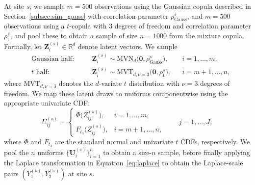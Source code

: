 \documentclass[12pt]{article}
\newcommand{\rhou}[1]{\rho_{\text{#1}}}
\newcommand{\RG}[1]{\Sigma_{\mathrm{Gauss}}^{#1}}   %
\newcommand{\RT}[1]{\Sigma_{t}^{#1}}                %
\begin{document}
At site $s$, we sample $m = 500$ observations using the Gaussian copula described in Section~\ref{subsec:sim_gauss} with correlation parameter $\rhou{Gauss}^s$, and $m = 500$ observations using a $t$-copula with 3 degrees of freedom and correlation parameter $\rhou{t}^s$, and pool these to obtain a sample of size $n=1000$ from the mixture copula. 
Formally, let $\mathbf{Z}_{i}^{(s)}\in\mathbb{R}^d$ denote latent vectors. We sample
\begin{equation}~\label{eq:mix_latent}
\begin{aligned}
  &\text{Gaussian half:}\quad &&\mathbf{Z}_{i}^{(s)} \sim \mbox{MVN}_d\!\big(\mathbf{0},\rhou{Gauss}^s\big),
&& i=1,\dots,m,\\[2pt]
  &\text{$t$ half:}\quad      &&\mathbf{Z}_{i}^{(s)} \sim \mbox{MVT}_{d,\nu=3}\!\big(\mathbf{0},\rhou{t}^s\big),
&& i=m+1,\dots,n,
\end{aligned}
\end{equation}
where $\mbox{MVT}_{d, \nu = 3}$ denotes the $d$-variate $t$ distribution with $\nu=3$ degrees of freedom.
We map these latent draws to uniforms componentwise using the appropriate univariate CDF:
\[
U_{ij}^{(s)} =
\begin{cases}
\Phi\!\big(Z_{ij}^{(s)}\big), & i=1,\dots,m,\\[4pt]
F_{t_3}\!\big(Z_{ij}^{(s)}\big), & i=m+1,\dots,n,
\end{cases}
\qquad j=1,\dots,J,
\]
where $\Phi$ and $F_{t_3}$ are the standard normal and univariate $t$ CDFs, respectively.
We pool the $n$ uniforms \(\{\mathbf{U}_{i}^{(s)}\}_{i=1}^n\) to obtain a size-$n$ sample, before finally applying the Laplace transformation in Equation~\eqref{eq:laplace} to obtain the Laplace-scale pairs \((Y_{1}^{(s)},Y_{2}^{(s)})\) at site \(s\).
\end{document}
